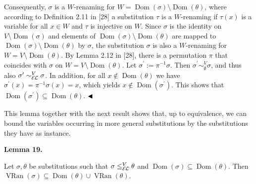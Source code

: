 \documentclass[10pt,a4paper]{amsart}
\begin{document}
 
 
Consequently, $\sigma$ is a $W$-renaming for $W=\operatorname{Dom}(\sigma)\setminus\operatorname{Dom}(\theta)$, where according to Definition 2.11 in [28] a substitution $\tau$ is a $W$-renaming if $\tau(x)$ is a variable for all $x\in W$ and $\tau$ is injective on $W$. Since $\sigma$ is the identity on $V\setminus\operatorname{Dom}(\sigma)$ and elements of $\operatorname{Dom}(\sigma)\setminus\operatorname{Dom}(\theta)$ are mapped to $\operatorname{Dom}(\sigma)\setminus\operatorname{Dom}(\theta)$ by $\sigma$, the substitution $\sigma$ is also a $W$-renaming for $W=V\setminus\operatorname{Dom}(\theta)$. By Lemma 2.12 in [28], there is a permutation $\pi$ that coincides with $\sigma$ on $W=V\setminus\operatorname{Dom}(\theta)$. Let $\sigma^{\prime}:=\pi^{-1}\sigma$. Then $\sigma^{\prime}\sim_{\emptyset}^{V}\sigma$, and thus also $\sigma^{\prime}\sim_{\mathcal{E\mkern-1.618muL}}^{V}\sigma$. In addition, for all $x\not\in\operatorname{Dom}(\theta)$ we have $\sigma^{\prime}(x)=\pi^{-1}\sigma(x)=x$, which yields $x\not\in\operatorname{Dom}(\sigma^{\prime})$. This shows that $\operatorname{Dom}(\sigma^{\prime})\subseteq\operatorname{Dom}(\theta)$. $\hfill\blacktriangleleft$\par
 
 
 
This lemma together with the next result shows that, up to equivalence, we can bound the variables occurring in more general substitutions by the substitutions they have as instance.\par
 
 
 
\par\medskip\noindent\textbf{Lemma 19.}\par
 
 
Let $\sigma,\theta$ be substitutions such that $\sigma\leq_{\mathcal{E\mkern-1.618muL}}^{V}\theta$ and $\operatorname{Dom}(\sigma)\subseteq\operatorname{Dom}(\theta)$. Then $\operatorname{VRan}(\sigma)\subseteq\operatorname{Dom}(\theta)\cup%
\operatorname{VRan}(\theta)$.\par
 
 
\end{document}
